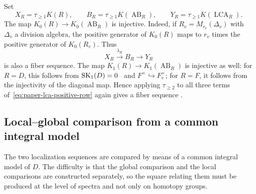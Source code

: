 Set
\[
 X_R=\tau_{\ge1}K(R),\qquad
 B_R=\tau_{\ge1}K(\operatorname{AB}_R),\qquad
 Y_R=\tau_{\ge1}K(\operatorname{LCA}_R).
\]
The map $K_0(R)\to K_0(\operatorname{AB}_R)$ is injective.
Indeed, if $R_v=M_{r_v}(\Delta_v)$ with $\Delta_v$ a division algebra, the positive generator of $K_0(R)$ maps to $r_v$ times the positive generator of $K_0(R_v)$.
Thus
\begin{equation}\label{eq:paper-lca-positive-row}
 X_R\xrightarrow{\lambda_R}B_R\longrightarrow Y_R
\end{equation}
is also a fiber sequence.
The map $K_1(R)\to K_1(\operatorname{AB}_R)$ is injective as well: for $R=D$, this follows from $\operatorname{SK}_1(D)=0$~\cite{Wang1950} and $F^\times\hookrightarrow F_v^\times$; for $R=F$, it follows from the injectivity of the diagonal map.
Hence applying $\tau_{\ge2}$ to all three terms of~\eqref{eq:paper-lca-positive-row} again gives a fiber sequence \cite[Construction 8.2 and Remark 8.3]{BHRAdeles}.

\subsection{Local--global comparison from a common integral model}
\label{subsec:paper-lca-comparison}
The two localization sequences are compared by means of a common integral model of $D$.
The difficulty is that the global comparison and the local comparisons are constructed separately, so the square relating them must be produced at the level of spectra and not only on homotopy groups.

